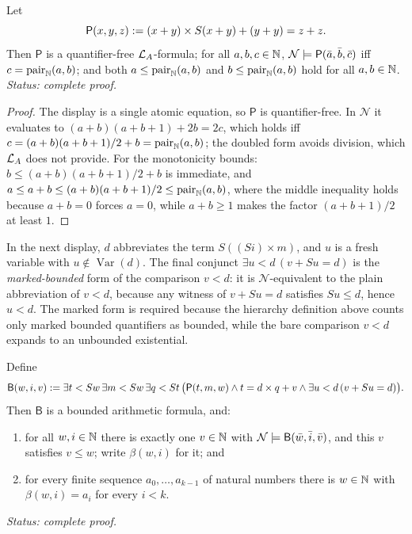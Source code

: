 \begin{lemma}
\label{lem:pairing-graph}
Let
\[
  \mathsf P(x,y,z)\mathrel{:=}(x+y)\times S(x+y)+(y+y)=z+z.
\]
Then \(\mathsf P\) is a quantifier-free \(\mathcal{L}_A\)-formula; for all
\(a,b,c\in\mathbb{N}\), \(\mathcal N\models\mathsf P(\bar a,\bar b,\bar c)\) iff
\(c=\operatorname{pair}_{\mathbb{N}}(a,b)\); and both
\(a\leq\operatorname{pair}_{\mathbb{N}}(a,b)\) and
\(b\leq\operatorname{pair}_{\mathbb{N}}(a,b)\) hold for all \(a,b\in\mathbb{N}\).
\textit{Status: complete proof.}
\end{lemma}

\begin{proof}
The display is a single atomic equation, so \(\mathsf P\) is
quantifier-free.  In \(\mathcal N\) it evaluates to
\((a+b)(a+b+1)+2b=2c\), which holds iff
\(c=(a+b)(a+b+1)/2+b=\operatorname{pair}_{\mathbb{N}}(a,b)\); the doubled form
avoids division, which \(\mathcal{L}_A\) does not provide.  For the monotonicity
bounds: \(b\leq(a+b)(a+b+1)/2+b\) is immediate, and
\(a\leq a+b\leq(a+b)(a+b+1)/2\leq\operatorname{pair}_{\mathbb{N}}(a,b)\), where the
middle inequality holds because \(a+b=0\) forces \(a=0\), while
\(a+b\geq1\) makes the factor \((a+b+1)/2\) at least \(1\).
\end{proof}

In the next display, \(d\) abbreviates the term \(S((Si)\times m)\), and
\(u\) is a fresh variable with \(u\notin\operatorname{Var}(d)\).  The final
conjunct \(\exists u<d\,(v+Su=d)\) is the \emph{marked-bounded} form of the
comparison \(v<d\): it is \(\mathcal N\)-equivalent to the plain
abbreviation of \(v<d\), because any witness of \(v+Su=d\) satisfies
\(Su\leq d\), hence \(u<d\).  The marked form is required because the
hierarchy definition above counts only marked bounded quantifiers as
bounded, while the bare comparison \(v<d\) expands to an unbounded
existential.

\begin{lemma}
\label{lem:goedel-beta}
Define
\[
  \mathsf B(w,i,v)\mathrel{:=}\exists t<Sw\,\exists m<Sw\,\exists q<St\,
  \bigl(\mathsf P(t,m,w)\land t=d\times q+v\land
  \exists u<d\,(v+Su=d)\bigr).
\]
Then \(\mathsf B\) is a bounded arithmetic formula, and:
\begin{enumerate}[label=(\alph*)]
\item for all \(w,i\in\mathbb{N}\) there is exactly one \(v\in\mathbb{N}\) with
      \(\mathcal N\models\mathsf B(\bar w,\bar i,\bar v)\), and this
      \(v\) satisfies \(v\leq w\); write \(\beta(w,i)\) for it; and
\item for every finite sequence \(a_0,\ldots,a_{k-1}\) of natural numbers
      there is \(w\in\mathbb{N}\) with \(\beta(w,i)=a_i\) for every \(i<k\).
\end{enumerate}
\textit{Status: complete proof.}
\end{lemma}

